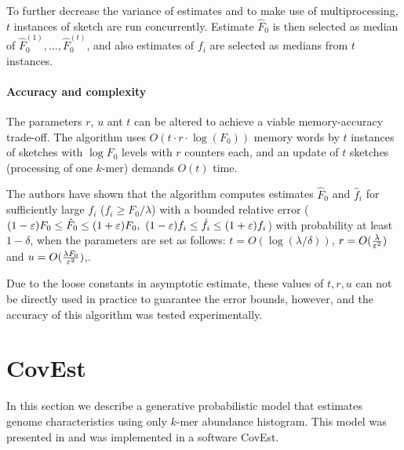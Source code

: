 \medskip

To further decrease the variance of estimates and to make use of multiprocessing, $t$ instances of sketch are run concurrently.
Estimate $\hat F_0$ is then selected as median of $\hat F_0^{(1)}, \dots, \hat F_0^{(t)}$, and also estimates of $f_i$ are
selected as medians from $t$ instances. 

\paragraph{Accuracy and complexity}
The parameters $r$, $u$ ant $t$ can be altered to achieve a viable memory-accuracy trade-off.
The algorithm uses $O(t \cdot r \cdot \log(F_0))$ memory words by $t$ instances of sketches with $\log F_0$ levels with $r$ counters each,
and an update of $t$ sketches (processing of one $k$-mer) demands $O(t)$ time.

The authors have shown that the algorithm computes estimates $\hat F_0$ and $\hat f_i$ for sufficiently large $f_i$ ($f_i \geq F_0 / \lambda$)
with a bounded relative error ($(1-\varepsilon)F_0 \leq \hat F_0 \leq (1+\varepsilon)F_0,~ (1-\varepsilon)f_i \leq \hat f_i \leq (1+\varepsilon)f_i$) with
probability at least $1 - \delta$, when the parameters are set as follows: $t = O(\log(\lambda/\delta))$, $r = O(\frac{\lambda}{\varepsilon^2})$ and $u = O(\frac{\lambda F_0}{\varepsilon^2})$,. 

Due to the loose constants in asymptotic estimate, these values of $t, r, u$ can not be directly used in practice to guarantee the error bounds, however,
and the accuracy of this algorithm was tested experimentally.


\section{CovEst}

In this section we describe a generative probabilistic model that estimates genome characteristics using only $k$-mer abundance histogram.
This model was presented in \cite{Hozza2015, Hozza2016} and was implemented in a software CovEst. 
